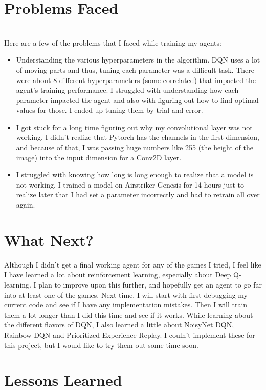 \documentclass[paper=a4, fontsize=11pt, margin=1in]{scrartcl}
\numberwithin{equation}{section}		%
\numberwithin{figure}{section}			%
\numberwithin{table}{section}				%
\begin{document}
\section{Problems Faced}\\
Here are a few of the problems that I faced while training my agents:
\begin{itemize}
    \item Understanding the various hyperparameters in the algorithm. DQN uses a lot of moving parts and thus, tuning each parameter was a difficult task. There were about 8 different hyperparameters (some correlated) that impacted the agent's training performance. I struggled with understanding how each parameter impacted the agent and also with figuring out how to find optimal values for those. I ended up tuning them by trial and error.
    \item I got stuck for a long time figuring out why my convolutional layer was not working. I didn't realize that Pytorch has the channels in the first dimension, and because of that, I was passing huge numbers like 255 (the height of the image) into the input dimension for a Conv2D layer.
    \item I struggled with knowing how long is long enough to realize that a model is not working. I trained a model on Airstriker Genesis for 14 hours just to realize later that I had set a parameter incorrectly and had to retrain all over again.
\end{itemize}

\section{What Next?}
Although I didn't get a final working agent for any of the games I tried, I feel like I have learned a lot about reinforcement learning, especially about Deep Q-learning. I plan to improve upon this further, and hopefully get an agent to go far into at least one of the games. Next time, I will start with first debugging my current code and see if I have any implementation mistakes. Then I will train them a lot longer than I did this time and see if it works. While learning about the different flavors of DQN, I also learned a little about NoisyNet DQN, Rainbow-DQN and Prioritized Experience Replay. I couln't implement these for this project, but I would like to try them out some time soon.

\section{Lessons Learned}
\end{document}
